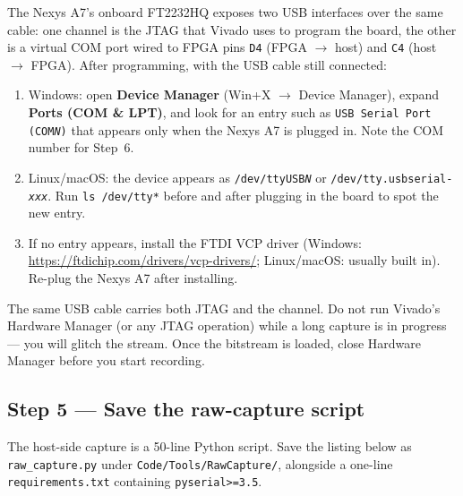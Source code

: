 \documentclass[11pt,letterpaper]{article}
\begin{document}
The Nexys A7's onboard FT2232HQ exposes two USB interfaces over the same cable: one channel is the \mbox{JTAG} that Vivado uses to program the board, the other is a virtual \mbox{COM} port wired to FPGA pins \texttt{D4} (FPGA $\to$ host) and \texttt{C4} (host $\to$ FPGA). After programming, with the \mbox{USB} cable still connected:

\begin{enumerate}[leftmargin=2em]
	\item Windows: open \textbf{Device Manager} (Win+X $\to$ Device Manager), expand \textbf{Ports (COM \& LPT)}, and look for an entry such as \texttt{USB Serial Port (COM\textit{N})} that appears only when the Nexys A7 is plugged in. Note the \mbox{COM} number for Step~6.
	\item Linux/macOS: the device appears as \texttt{/dev/ttyUSB\textit{N}} or \texttt{/dev/tty.usbserial-\textit{xxx}}. Run \texttt{ls /dev/tty*} before and after plugging in the board to spot the new entry.
	\item If no entry appears, install the FTDI VCP driver (Windows: \url{https://ftdichip.com/drivers/vcp-drivers/}; Linux/macOS: usually built in). Re-plug the Nexys A7 after installing.
\end{enumerate}

\begin{tcolorbox}[warning={Do not unplug the board mid-capture}]
	The same \mbox{USB} cable carries both \mbox{JTAG} and the \UART{} channel. Do not run Vivado's Hardware Manager (or any \mbox{JTAG} operation) while a long capture is in progress --- you will glitch the \UART{} stream. Once the bitstream is loaded, close Hardware Manager before you start recording.
\end{tcolorbox}

\newpage
\subsection{Step 5 --- Save the raw-capture script}

The host-side capture is a 50-line Python script. Save the listing below as \texttt{raw\_capture.py} under \texttt{Code/Tools/RawCapture/}, alongside a one-line \texttt{requirements.txt} containing \texttt{pyserial>=3.5}.
\end{document}
